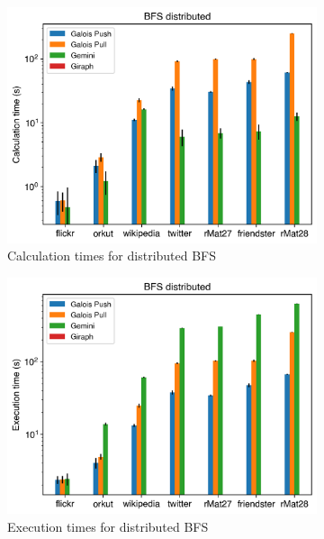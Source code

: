 \begin{figure}
	\begin{subfigure}{0.3\textwidth}
		\includegraphics[width=\linewidth]{../../plots/distributedBFS_calcTime.png}
		\caption{Calculation times for distributed BFS}
		\label{fig:distributedBFS_calc}
	\end{subfigure}
	\hfil
	\begin{subfigure}{0.3\textwidth}
		\includegraphics[width=\linewidth]{../../plots/distributedBFS_execTime.png}
		\caption{Execution times for distributed BFS}
		\label{fig:distributedBFS_exec}
	\end{subfigure}
	\hfil
	\begin{subfigure}{0.3\textwidth}

\end{subfigure}
\end{figure}
